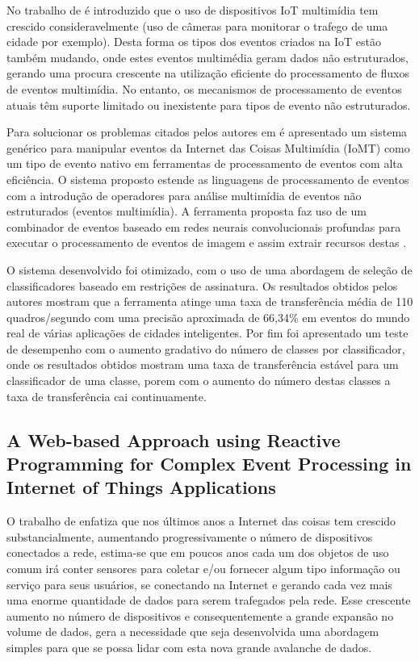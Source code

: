 \documentclass[ti,table]{texufpel} %
\begin{document}
	No trabalho de \cite{art1aslam2018towards} é introduzido que o uso de dispositivos IoT multimídia tem crescido consideravelmente (uso de câmeras para monitorar o trafego de uma cidade por exemplo). Desta forma os tipos dos eventos criados na IoT estão também mudando, onde estes eventos multimédia geram dados não estruturados, gerando uma procura crescente na utilização eficiente do processamento de fluxos de eventos multimídia. No entanto, os mecanismos de processamento de eventos atuais têm suporte limitado ou inexistente para tipos de evento não estruturados.
	
	Para solucionar os problemas citados pelos autores em \cite{art1aslam2018towards} é apresentado um sistema genérico para manipular eventos da Internet das Coisas Multimídia (IoMT) como um tipo de evento nativo em ferramentas de processamento de eventos com alta eficiência. O sistema proposto estende as linguagens de processamento de eventos com a introdução de operadores para análise multimídia de eventos não estruturados (eventos multimídia). A ferramenta proposta faz uso de um combinador de eventos baseado em redes neurais convolucionais profundas para executar o processamento de eventos de imagem e assim extrair recursos destas .
	
	 O sistema desenvolvido foi otimizado, com o uso de uma abordagem de seleção de classificadores baseado em restrições de assinatura. Os resultados obtidos pelos autores mostram que a ferramenta atinge uma taxa de transferência média de 110 quadros/segundo com uma precisão aproximada de 66,34\% em eventos do mundo real de várias aplicações de cidades inteligentes. Por fim foi apresentado um teste de desempenho com o aumento  gradativo do número de classes por classificador, onde os resultados obtidos mostram uma taxa de transferência estável para um classificador de uma classe, porem com o aumento do número destas classes a taxa de transferência cai continuamente.  
	



\subsection{A Web-based Approach using Reactive Programming for Complex Event Processing in Internet of Things Applications}	
	
	O trabalho de \cite{art2zimmerle2018web} enfatiza que nos últimos anos a Internet das coisas tem crescido substancialmente, aumentando progressivamente o número de dispositivos conectados a rede, estima-se que em poucos anos cada um dos objetos de uso comum irá conter sensores para coletar e/ou fornecer algum tipo informação ou serviço para seus usuários, se conectando na Internet e gerando cada vez mais uma enorme quantidade de dados para serem trafegados pela rede. Esse crescente aumento no número de dispositivos e consequentemente a grande expansão no volume de dados, gera a necessidade que seja desenvolvida uma abordagem simples para que se possa lidar com esta nova grande avalanche de dados.
	
\end{document}
